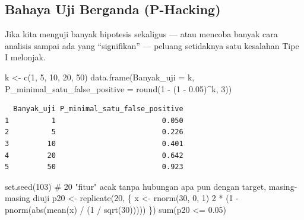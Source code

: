 \documentclass[
  indonesian,
  letterpaper,
]{book}
\newenvironment{Shaded}{\begin{snugshade}}{\end{snugshade}}
\newcommand{\AttributeTok}[1]{\textcolor[rgb]{0.40,0.45,0.13}{#1}}
\newcommand{\CommentTok}[1]{\textcolor[rgb]{0.37,0.37,0.37}{#1}}
\newcommand{\DecValTok}[1]{\textcolor[rgb]{0.68,0.00,0.00}{#1}}
\newcommand{\FloatTok}[1]{\textcolor[rgb]{0.68,0.00,0.00}{#1}}
\newcommand{\FunctionTok}[1]{\textcolor[rgb]{0.28,0.35,0.67}{#1}}
\newcommand{\NormalTok}[1]{\textcolor[rgb]{0.00,0.23,0.31}{#1}}
\newcommand{\OtherTok}[1]{\textcolor[rgb]{0.00,0.23,0.31}{#1}}
\newcommand{\SpecialCharTok}[1]{\textcolor[rgb]{0.37,0.37,0.37}{#1}}
\begin{document}
\subsection{Bahaya Uji Berganda
(P-Hacking)}\label{bahaya-uji-berganda-p-hacking}

Jika kita menguji banyak hipotesis sekaligus --- atau mencoba banyak
cara analisis sampai ada yang ``signifikan'' --- peluang setidaknya satu
kesalahan Tipe I melonjak.

\begin{Shaded}
\begin{Highlighting}[]
\NormalTok{k }\OtherTok{\textless{}{-}} \FunctionTok{c}\NormalTok{(}\DecValTok{1}\NormalTok{, }\DecValTok{5}\NormalTok{, }\DecValTok{10}\NormalTok{, }\DecValTok{20}\NormalTok{, }\DecValTok{50}\NormalTok{)}
\FunctionTok{data.frame}\NormalTok{(}\AttributeTok{Banyak\_uji =}\NormalTok{ k, }\AttributeTok{P\_minimal\_satu\_false\_positive =} \FunctionTok{round}\NormalTok{(}\DecValTok{1} \SpecialCharTok{{-}}\NormalTok{ (}\DecValTok{1} \SpecialCharTok{{-}} \FloatTok{0.05}\NormalTok{)}\SpecialCharTok{\^{}}\NormalTok{k, }\DecValTok{3}\NormalTok{))}
\end{Highlighting}
\end{Shaded}

\begin{verbatim}
  Banyak_uji P_minimal_satu_false_positive
1          1                         0.050
2          5                         0.226
3         10                         0.401
4         20                         0.642
5         50                         0.923
\end{verbatim}

\begin{Shaded}
\begin{Highlighting}[]
\FunctionTok{set.seed}\NormalTok{(}\DecValTok{103}\NormalTok{)}
\CommentTok{\# 20 "fitur" acak tanpa hubungan apa pun dengan target, masing{-}masing diuji}
\NormalTok{p20 }\OtherTok{\textless{}{-}} \FunctionTok{replicate}\NormalTok{(}\DecValTok{20}\NormalTok{, \{}
\NormalTok{  x }\OtherTok{\textless{}{-}} \FunctionTok{rnorm}\NormalTok{(}\DecValTok{30}\NormalTok{, }\DecValTok{0}\NormalTok{, }\DecValTok{1}\NormalTok{)}
  \DecValTok{2} \SpecialCharTok{*}\NormalTok{ (}\DecValTok{1} \SpecialCharTok{{-}} \FunctionTok{pnorm}\NormalTok{(}\FunctionTok{abs}\NormalTok{(}\FunctionTok{mean}\NormalTok{(x) }\SpecialCharTok{/}\NormalTok{ (}\DecValTok{1} \SpecialCharTok{/} \FunctionTok{sqrt}\NormalTok{(}\DecValTok{30}\NormalTok{)))))}
\NormalTok{\})}
\FunctionTok{sum}\NormalTok{(p20 }\SpecialCharTok{\textless{}=} \FloatTok{0.05}\NormalTok{)}
\end{Highlighting}
\end{Shaded}
\end{document}
